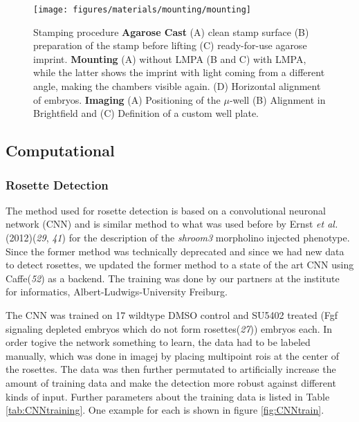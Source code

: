 \documentclass[11pt,singlespacinge,twoside]{reedthesis} %
\begin{document}
\begin{figure}

{\centering \texttt{[image: figures/materials/mounting/mounting]} 

}

\caption[Steps during improved zebrafish mounting]{Stamping procedure \textbf{Agarose Cast} (A) clean stamp surface (B) preparation of the stamp before lifting (C) ready-for-use agarose imprint. \textbf{Mounting} (A) without LMPA (B and C) with LMPA, while the latter shows the imprint with light coming from a different angle, making the chambers visible again. (D) Horizontal alignment of embryos. \textbf{Imaging} (A) Positioning of the \(\mu\)-well (B) Alignment in Brightfield and (C) Definition of a custom well plate.}\label{fig:stampprod}
\end{figure}
\hypertarget{comp-met}{%
\subsection{Computational}\label{comp-met}}

\hypertarget{CNN}{%
\subsubsection{Rosette Detection}\label{CNN}}

The method used for rosette detection is based on a convolutional neuronal network (CNN) and is similar method to what was used before by Ernst \emph{et al.}(2012)(\emph{29}, \emph{41}) for the description of the \emph{shroom3} morpholino injected phenotype. Since the former method was technically deprecated and since we had new data to detect rosettes, we updated the former method to a state of the art CNN using Caffe(\emph{52}) as a backend. The training was done by our partners at the institute for informatics, Albert-Ludwigs-University Freiburg.

The CNN was trained on 17 wildtype DMSO control and SU5402 treated (Fgf signaling depleted embryos which do not form rosettes(\emph{27})) embryos each. In order togive the network something to learn, the data had to be labeled manually, which was done in imagej by placing multipoint rois at the center of the rosettes. The data was then further permutated to artificially increase the amount of training data and make the detection more robust against different kinds of input. Further parameters about the training data is listed in Table \ref{tab:CNNtraining}. One example for each is shown in figure \ref{fig:CNNtrain}.
\end{document}
